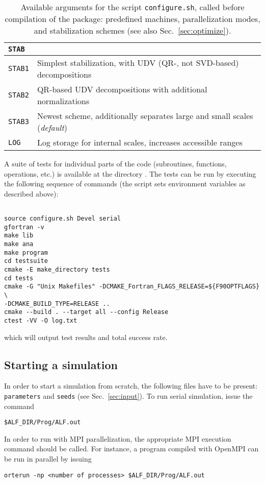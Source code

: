 \begin{table}[!ht]
\begin{center}
\begin{tabular}{@{} p{} p{} @{}}
			\textbf{\texttt{STAB}} &  \\\midrule
			\texttt{STAB1}  &  Simplest stabilization, with UDV (QR-, not SVD-based) decompositions\\
			\texttt{STAB2}  &  QR-based UDV decompositions with additional normalizations\\
			\texttt{STAB3}  &  Newest scheme, additionally separates large and small scales (\emph{default})\\
			\texttt{LOG}  &  Log storage for internal scales, increases accessible ranges\\\bottomrule
		\end{tabular}
		\caption{Available arguments for the script \texttt{configure.sh}, called before compilation of the package: predefined machines, parallelization modes, and stabilization schemes (see also Sec.~\ref{sec:optimize}).} \label{table:configureHPC}
	\end{center}
\end{table}

A suite of tests for individual parts of the code (subroutines, functions, operations, etc.) is available at the directory . The tests can be run by executing the following sequence of commands (the script  sets environment variables as described above):
\begin{lstlisting}[style=bash,morekeywords={make,cmake,ctest}]

source configure.sh Devel serial
gfortran -v
make lib
make ana
make program
cd testsuite
cmake -E make_directory tests
cd tests
cmake -G "Unix Makefiles" -DCMAKE_Fortran_FLAGS_RELEASE=${F90OPTFLAGS} \
-DCMAKE_BUILD_TYPE=RELEASE ..
cmake --build . --target all --config Release
ctest -VV -O log.txt
\end{lstlisting}
which will output test results and total success rate.

%
\subsection*{Starting a simulation}
%

In order to start a simulation from scratch, the following files have to be present: \texttt{parameters} and \texttt{seeds} (see Sec.~\ref{sec:input}). 
To run serial simulation, issue the command
\begin{lstlisting}[style=bash]
$ALF_DIR/Prog/ALF.out
\end{lstlisting}
In order to run with MPI parallelization, the appropriate MPI execution command should be called. For instance, a program compiled with OpenMPI can be run in parallel by issuing  
\begin{lstlisting}[style=bash]
orterun -np <number of processes> $ALF_DIR/Prog/ALF.out
\end{lstlisting}

